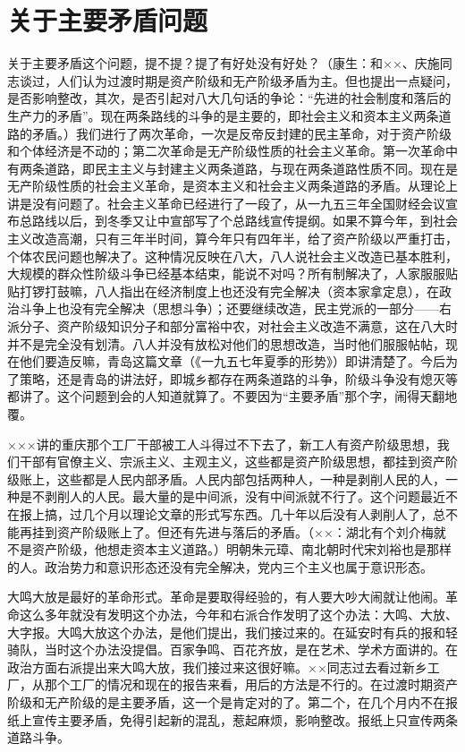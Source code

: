 \section[关于主要矛盾问题（一九五七年） ]{关于主要矛盾问题 }


关于主要矛盾这个问题，提不提？提了有好处没有好处？（康生：和××、庆施同志谈过，人们认为过渡时期是资产阶级和无产阶级矛盾为主。但也提出一点疑问，是否影响整改，其次，是否引起对八大几句话的争论：“先进的社会制度和落后的生产力的矛盾”。现在两条路线的斗争的是主要的，即社会主义和资本主义两条道路的矛盾。）我们进行了两次革命，一次是反帝反封建的民主革命，对于资产阶级和个体经济是不动的；第二次革命是无产阶级性质的社会主义革命。第一次革命中有两条道路，即民主主义与封建主义两条道路，与现在两条道路性质不同。现在是无产阶级性质的社会主义革命，是资本主义和社会主义两条道路的矛盾。从理论上讲是没有问题了。社会主义革命已经进行了一段了，从一九五三年全国财经会议宣布总路线以后，到冬季又让中宣部写了个总路线宣传提纲。如果不算今年，到社会主义改造高潮，只有三年半时间，算今年只有四年半，给了资产阶级以严重打击，个体农民问题也解决了。这种情况反映在八大，八人说社会主义改造已基本胜利，大规模的群众性阶级斗争已经基本结束，能说不对吗？所有制解决了，人家服服贴贴打锣打鼓嘛，八人指出在经济制度上也还没有完全解决（资本家拿定息），在政治斗争上也没有完全解决（思想斗争）；还要继续改造，民主党派的一部分——右派分子、资产阶级知识分子和部分富裕中农，对社会主义改造不满意，这在八大时并不是完全没有划清。八人并没有放松对他们的思想改造，当时他们服服帖帖，现在他们要造反嘛，青岛这篇文章（《一九五七年夏季的形势》）即讲清楚了。今后为了策略，还是青岛的讲法好，即城乡都存在两条道路的斗争，阶级斗争没有熄灭等都讲了。这个问题到会的人知道就算了。不要因为“主要矛盾”那个字，闹得天翻地覆。

×××讲的重庆那个工厂干部被工人斗得过不下去了，新工人有资产阶级思想，我们干部有官僚主义、宗派主义、主观主义，这些都是资产阶级思想，都挂到资产阶级账上，这些都是人民内部矛盾。人民内部包括两种人，一种是剥削人民的人，一种是不剥削人的人民。最大量的是中间派，没有中间派就不行了。这个问题最近不在报上搞，过几个月以理论文章的形式写东西。几十年以后没有人剥削人了，总不能再挂到资产阶级账上了。但还有先进与落后的矛盾。（××：湖北有个刘介梅就不是资产阶级，他想走资本主义道路。）明朝朱元璋、南北朝时代宋刘裕也是那样的人。政治势力和意识形态还没有完全解决，党内三个主义也属于意识形态。

大鸣大放是最好的革命形式。革命是要取得经验的，有人要大吵大闹就让他闹。革命这么多年就没有发明这个办法，今年和右派合作发明了这个办法：大鸣、大放、大字报。大鸣大放这个办法，是他们提出，我们接过来的。在延安时有兵的报和轻骑队，当时这个办法没提倡。百家争鸣、百花齐放，是在艺术、学术方面讲的。在政治方面右派提出来大鸣大放，我们接过来这很好嘛。××同志过去看过新乡工厂，从那个工厂的情况和现在的报告来看，用后的方法是不行的。在过渡时期资产阶级和无产阶级的是主要矛盾，这一个是肯定对的了。第二个，在几个月内不在报纸上宣传主要矛盾，免得引起新的混乱，惹起麻烦，影响整改。报纸上只宣传两条道路斗争。

